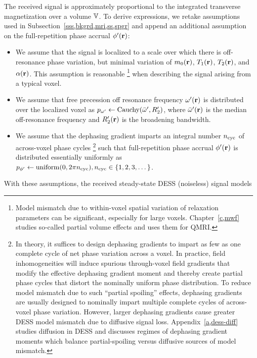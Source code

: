 The received signal is approximately proportional
to the integrated transverse magnetization 
over a volume $\mathbb{V}$.
To derive expressions,
we retake assumptions used
in Subsection~\ref{sss,bkgrd,mri,ss,spgr}
and append an additional assumption
on the full-repetition phase accrual $\php\pr$:
\begin{itemize}
	\item We assume that
		the signal is localized
		to a scale over which
		there is off-resonance phase variation,
		but minimal variation
		of $\mzero\pr$, $\To\pr$, $\Tt\pr$, and $\flip\pr$.
		This assumption is reasonable
		\footnote{Model mismatch due
			to within-voxel spatial variation 
			of relaxation parameters
			can be significant,
			especially for large voxels.
			Chapter~\ref{c,mwf} studies 
			so-called partial volume effects
			and uses them for QMRI.
		} 
		when describing the signal 
		arising from a typical voxel.
	\item We assume that
		free precession off resonance frequency $\omp\pr$
		is distributed over the localized voxel
		as $\dist{\omp} \gets \operatorname{Cauchy}\paren{\ompmed,\Rtp}$,
		where $\ompmed\pr$ is the median off-resonance frequency
		and $\Rtp\pr$ is the broadening bandwidth.
	\item We assume that 
		the dephasing gradient imparts 
		an integral number $n_\mathrm{cyc}$ of across-voxel phase cycles
		\footnote{In theory,
			it suffices to design dephasing gradients
			to impart as few as one complete cycle
			of net phase variation across a voxel.
			In practice,
			field inhomogeneities will induce
			spurious through-voxel field gradients 
			that modify the effective dephasing gradient moment
			and thereby create partial phase cycles
			that distort the nominally uniform phase distribution.
			To reduce model mismatch 
			due to such ``partial spoiling'' effects,
			dephasing gradients are usually designed
			to nominally impart multiple complete cycles
			of across-voxel phase variation.
			However, 
			larger dephasing gradients
			cause greater DESS model mismatch
			due to diffusive signal loss.
			Appendix~\ref{a,dess-diff} 
			studies diffusion in DESS
			and discusses regimes of dephasing gradient moments
			which balance partial-spoiling versus diffusive
			sources of model mismatch.
		}
		such that full-repetition phase accrual $\php\pr$ 
		is distributed essentially uniformly
		as $\dist{\php} \gets \operatorname{uniform}\paren{0,2\pi\cyc},
		\cyc\in\set{1,2,3,\dots}$.  
\end{itemize}
With these assumptions, 
the received steady-state DESS (noiseless) signal models
